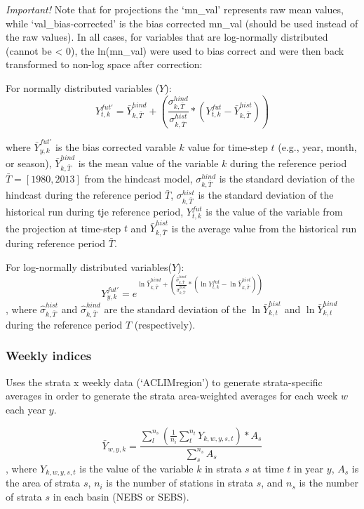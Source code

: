 \documentclass[
]{article}
\begin{document}
\emph{Important!} Note that for projections the `mn\_val' represents raw
mean values, while `val\_bias-corrected' is the bias corrected mn\_val
(should be used instead of the raw values). In all cases, for variables
that are log-normally distributed (cannot be \textless{} 0), the
ln(mn\_val) were used to bias correct and were then back transformed to
non-log space after correction:

For normally distributed variables (\(Y\)):
\[{Y}^{fut'}_{t,k} =\bar{Y}^{hind}_{k,\bar{T}} +\left( \frac{\sigma^{hind}_{k,\bar{T}}}{\sigma^{hist}_{k,\bar{T}}}*({Y}^{fut}_{t,k}-\bar{Y}^{hist}_{k,\bar{T}})  \right )\]

where \(\bar{Y}^{fut'}_{y,k}\) is the bias corrected varable \(k\) value
for time-step \(t\) (e.g., year, month, or season),
\(\bar{Y}^{hind}_{k,\bar{T}}\) is the mean value of the variable \(k\)
during the reference period \(\bar{T}=[1980,2013]\) from the hindcast
model, \(\sigma^{hind}_{k,\bar{T}}\) is the standard deviation of the
hindcast during the reference period \(\bar{T}\),
\(\sigma^{hist}_{k,\bar{T}}\) is the standard deviation of the
historical run during tje reference period, \({Y}^{fut}_{t,k}\) is the
value of the variable from the projection at time-step \(t\) and
\(\bar{Y}^{hist}_{k,\bar{T}}\) is the average value from the historical
run during reference period \(\bar{T}\).

For log-normally distributed variables(\(Y\)):
\[{Y}^{fut'}_{y,k} =e^{\ln\bar{Y}^{hind}_{k,\bar{T}} +\left( \frac{\hat{\sigma}^{hind}_{k,\bar{T}}}{\hat{\sigma}^{hist}_{k,\bar{T}}}*(\ln{Y}^{fut}_{t,k}-\ln\bar{Y}^{hist}_{k,\bar{T}})  \right )}\],
where \(\hat\sigma^{hist}_{k,\bar{T}}\) and
\(\hat\sigma^{hind}_{k,\bar{T}}\) are the standard deviation of the
\(\ln\bar{Y}^{hist}_{k,t}\) and \(\ln\bar{Y}^{hind}_{k,t}\) during the
reference period \(\hat{T}\) (respectively).

\hypertarget{weekly-indices}{%
\subsubsection{Weekly indices}\label{weekly-indices}}

Uses the strata x weekly data (`ACLIMregion') to generate
strata-specific averages in order to generate the strata area-weighted
averages for each week \(w\) each year \(y\).

\[\bar{Y}_{w,y,k}= \frac{\sum^{n_s}_{l}(\frac{1}{n_i}\sum^{n_t}_{t}Y_{k,w,y,s,t})*A_s} {\sum^{n_s}_{s}{A_s}}\],
where \(Y_{k,w,y,s,t}\) is the value of the variable \(k\) in strata
\(s\) at time \(t\) in year \(y\), \(A_s\) is the area of strata \(s\),
\(n_i\) is the number of stations in strata \(s\), and \(n_s\) is the
number of strata \(s\) in each basin (NEBS or SEBS).
\end{document}
